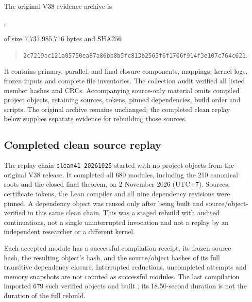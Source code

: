 \documentclass[11pt,a4paper]{article}
\theoremstyle{definition}
\newcommand{\code}[1]{\texttt{#1}}
\begin{document}
\begin{samepage}
The original V38 evidence archive is
\begin{center}\small{},\end{center}
of size 7,737,985,716 bytes and SHA256
\begin{quote}\small\nolinkurl{2c7219ac121a05750ea87a86bb8b5fc813b2565f6f1706f914f3e107c764c621}.\end{quote}
\end{samepage}
It contains primary, parallel, and final-closure components, mappings, kernel logs, frozen inputs and complete file inventories. The collection audit verified all listed member hashes and CRCs. Accompanying source-only material omits compiled project objects, retaining sources, tokens, pinned dependencies, build order and scripts. The original archive remains unchanged; the completed clean replay below supplies separate evidence for rebuilding those sources.

\subsection{Completed clean source replay}\label{sec:clean-replay}
The replay chain \code{clean41-20261025} started with no project objects from the original V38 release. It completed all 680 modules, including the 210 canonical roots and the closed final theorem, on 2 November 2026 (UTC+7). Sources, certificate tokens, the Lean compiler and all nine dependency revisions were pinned. A dependency object was reused only after being built and source/object-verified in this same clean chain. This was a staged rebuild with audited continuations, not a single uninterrupted invocation and not a replay by an independent researcher or a different kernel.

Each accepted module has a successful compilation receipt, its frozen source hash, the resulting object's hash, and the source/object hashes of its full transitive dependency closure. Interrupted reductions, uncompleted attempts and memory snapshots are not counted as successful modules. The last compilation imported 679 such verified objects and built ; its 18.50-second duration is not the duration of the full rebuild.
\end{document}
